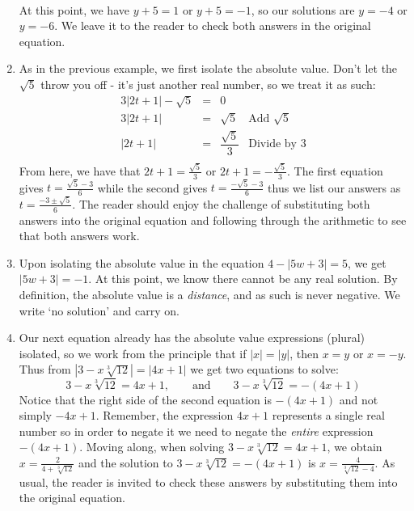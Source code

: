 \begin{ex}
\begin{enumerate}
\[\begin{array}{rclr}
\end{array} \] At this point, we have $y+5 = 1$ or $y+5 = -1$, so our solutions are $y = -4$ or $y = -6$.  We leave it to the reader to check both answers in the original equation.

\item As in the previous example, we first isolate the absolute value.  Don't let the $\sqrt{5}$ throw you off - it's just another real number, so we treat it as such:\[ \begin{array}{rclr}

 3|2t+1| - \sqrt{5} & = & 0 & \\
 3|2t+1|  & = &  \sqrt{5} & \text{Add $\sqrt{5}$} \\
 |2t + 1| & = & \dfrac{\sqrt{5}}{3} & \text{Divide by $3$}\\
\end{array} \] From here, we have that $2t+1 = \frac{\sqrt{5}}{3}$ or $2t+1 = -\frac{\sqrt{5}}{3}$. The first equation gives $t = \frac{\sqrt{5}-3}{6}$ while the second gives $t = \frac{-\sqrt{5}-3}{6}$ thus we list our answers as $t = \frac{-3 \pm \sqrt{5}}{6}$.   The reader should enjoy the challenge of substituting both answers into the original equation and following through the arithmetic to see that both answers work.

\item  Upon isolating the absolute value in the equation $4 - |5w+3| = 5$, we get $|5w+3| = -1$.  At this point, we know there cannot be any real solution.  By definition, the absolute value is a \textit{distance}, and as such is never negative.  We write `no solution' and carry on.

\item Our next equation already has the absolute value expressions (plural) isolated, so we work from the principle that if $|x| = |y|$, then $x = y$ or $x = -y$. Thus from $\left|3 - x \sqrt[3]{12}\right| = |4x+1|$ we get two equations to solve:  \[ 3 - x \sqrt[3]{12} = 4x+1, \qquad \text{and} \qquad 3 - x \sqrt[3]{12} = -(4x+1) \] Notice that the right side of the second equation is $-(4x+1)$ and not simply $-4x+1$.  Remember, the expression $4x+1$ represents a single real number so in order to negate it we need to negate the \textit{entire} expression $-(4x+1)$. Moving along, when solving $3 - x \sqrt[3]{12} = 4x+1$, we obtain $x = \frac{2}{4 + \sqrt[3]{12}}$ and the solution to $3 - x \sqrt[3]{12} = -(4x+1)$ is $x = \frac{4}{\sqrt[3]{12}-4}$.  As usual, the reader is invited to check these answers by substituting them into the original equation.


\end{enumerate}
\end{ex}
